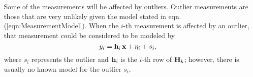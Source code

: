 Some of the measurements will be affected by outliers.
Outlier measurements are those that are very unlikely given the model stated in eqn. (\ref{eqn:MeasurementModel}). 
When the $i$-th measurement is affected by an outlier, that measurement could be considered to be modeled by
\begin{equation}\label{eqn:MeasurementModel_s}
	y_i = \mathbf{h}_i \, \mathbf{x} + \eta_i +s_i,
\end{equation} where $s_i$ represents the outlier and $\mathbf{h}_i$ is the $i$-th row of $\mathbf{H}_k$; however, 
there is usually no known model for the outlier $s_i$.




